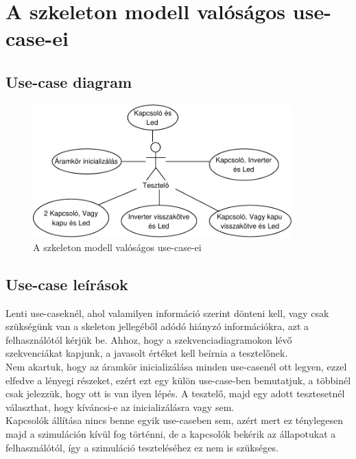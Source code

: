 \section{A szkeleton modell valóságos use-case-ei}

\subsection{Use-case diagram}

\begin{figure}[h]
\begin{center}
\includegraphics[width=10cm]{chapters/chapter05/imgs/usecase.pdf}
\caption{A szkeleton modell valóságos use-case-ei}
\label{fig:SzkeletonUseCase}
\end{center}
\end{figure}

\subsection{Use-case leírások}

Lenti use-caseknél, ahol valamilyen információ szerint dönteni kell, vagy csak szükségünk van a skeleton jellegéből adódó hiányzó információkra, azt a felhasználótól kérjük be. Ahhoz, hogy a szekvenciadiagramokon lévő szekvenciákat kapjunk, a javasolt értéket kell beírnia a tesztelőnek.\\

Nem akartuk, hogy az áramkör inicializálása minden use-casenél ott legyen, ezzel elfedve a lényegi részeket, ezért ezt egy külön use-case-ben bemutatjuk, a többinél csak jelezzük, hogy ott is van ilyen lépés. A tesztelő, majd egy adott tesztesetnél választhat, hogy kíváncsi-e az inicializálásra vagy sem.\\

Kapcsolók állítása nincs benne egyik use-caseben sem, azért mert ez ténylegesen majd a szimuláción kívül fog történni, de a kapcsolók bekérik az állapotukat a felhasználótól, így a szimuláció teszteléséhez ez nem is szükséges.

